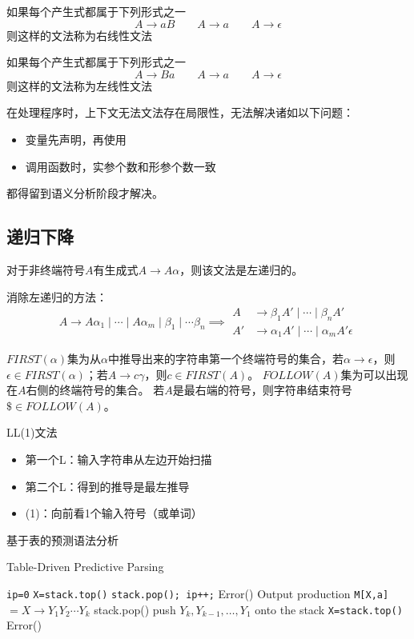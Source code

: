 \begin{definition}[右线性文法]
如果每个产生式都属于下列形式之一
\[A\to aB\qquad A\to a\qquad A\to\epsilon\]
则这样的文法称为右线性文法
\end{definition}
\begin{definition}[左线性文法]
如果每个产生式都属于下列形式之一
\[A\to Ba\qquad A\to a\qquad A\to\epsilon\]
则这样的文法称为左线性文法
\end{definition}

在处理程序时，上下文无法文法存在局限性，无法解决诸如以下问题：
\begin{itemize}
\item 变量先声明，再使用
\item 调用函数时，实参个数和形参个数一致
\end{itemize}
都得留到语义分析阶段才解决。

\subsection{递归下降}
\begin{definition}[左递归]
对于非终端符号$A$有生成式$A\to A\alpha$，则该文法是左递归的。
\end{definition}
消除左递归的方法：
\[A\to A\alpha_1\mid \cdots\mid A\alpha_m\mid\beta_1\mid\cdots\beta_n
\implies
\begin{aligned}
A &\to\beta_1 A'\mid\cdots\mid\beta_n A'\\
A' &\to\alpha_1 A'\mid\cdots\mid\alpha_m A'\epsilon
\end{aligned}\]

\begin{definition}[FIRST集与FOLLOW集]
$FIRST(\alpha)$集为从$\alpha$中推导出来的字符串第一个终端符号的集合，若$\alpha\to\epsilon$，则$\epsilon\in FIRST(\alpha)$；若$A\to c\gamma$，则$c\in FIRST(A)$。
$FOLLOW(A)$集为可以出现在$A$右侧的终端符号的集合。
若$A$是最右端的符号，则字符串结束符号$\$\in FOLLOW(A)$。
\end{definition}

LL(1)文法
\begin{itemize}
	\item 第一个L：输入字符串从左边开始扫描
	\item 第二个L：得到的推导是最左推导
	\item (1)：向前看1个输入符号（或单词）
\end{itemize}

基于表的预测语法分析
\begin{algorithm}
\caption{Table-Driven Predictive Parsing}
\begin{algorithmic}[1]
\State \verb'ip=0'
\State \verb'X=stack.top()'
\State \verb'stack.pop(); ip++;'
\Else {}
\State Error()
\Else
\State Output production \verb'M[X,a]'$=X\to Y_1Y_2\cdots Y_k$
\State stack.pop()
\State push $Y_k,Y_{k-1},\ldots,Y_1$ onto the stack
\EndIf
\EndIf
\State \verb'X=stack.top()'
\EndWhile
{}
\State Error()
\EndIf
\end{algorithmic}
\end{algorithm}